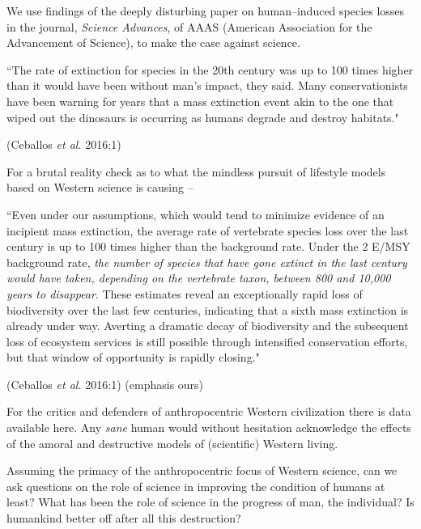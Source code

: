 We use findings of the deeply disturbing paper on human–induced species losses in the journal, \textit{Science Advances}, of AAAS (American Association for the Advancement of Science), to make the case against science.

\begin{myquote}
“The rate of extinction for species in the 20th century was up to 100 times higher than it would have been without man’s impact, they said. Many conservationists have been warning for years that a mass extinction event akin to the one that wiped out the dinosaurs is occurring as humans degrade and destroy habitats."
\end{myquote}

\hfill (Ceballos \textit{et al.} 2016:1)

For a brutal reality check as to what the mindless pursuit of lifestyle models based on Western science is causing –

\begin{myquote}
“Even under our assumptions, which would tend to minimize evidence of an incipient mass extinction, the average rate of vertebrate species loss over the last century is up to 100 times higher than the background rate. Under the 2 E/MSY background rate, \textit{the number of species that have gone extinct in the last century would have taken, depending on the vertebrate taxon, between 800 and 10,000 years to disappear}. These estimates reveal an exceptionally rapid loss of biodiversity over the last few centuries, indicating that a sixth mass extinction is already under way. Averting a dramatic decay of biodiversity and the subsequent loss of ecosystem services is still possible through intensified conservation efforts, but that window of opportunity is rapidly closing."
\end{myquote}

\hfill (Ceballos \textit{et al.} 2016:1) (emphasis ours)

For the critics and defenders of anthropocentric Western civilization there is data available here. Any \textit{sane} human would without hesitation acknowledge the effects of the amoral and destructive models of (scientific) Western living.

Assuming the primacy of the anthropocentric focus of Western science, can we ask questions on the role of science in improving the condition of humans at least? What has been the role of science in the progress of man, the individual? Is humankind better off after all this destruction?

